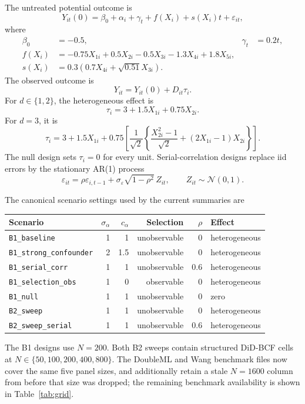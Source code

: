 \documentclass[11pt]{article}
\begin{document}
The untreated potential outcome is
\begin{equation}
 Y_{it}(0)=\beta_0+\alpha_i+\gamma_t+f(X_i)+s(X_i)t+\varepsilon_{it},
 \label{eq:untreated}
\end{equation}
where
\begin{align}
 \beta_0&=-0.5, & \gamma_t&=0.2t,\\
 f(X_i)&=-0.75X_{1i}+0.5X_{2i}-0.5X_{3i}-1.3X_{4i}+1.8X_{5i},\\
 s(X_i)&=0.3\left(0.7X_{4i}+\sqrt{0.51}X_{3i}\right).
 \label{eq:canonical-components}
\end{align}
The observed outcome is
\begin{equation}
 Y_{it}=Y_{it}(0)+D_{it}\tau_i.
 \label{eq:canonical-outcome}
\end{equation}
For $d\in\{1,2\}$, the heterogeneous effect is
\begin{equation}
 \tau_i=3+1.5X_{1i}+0.75X_{2i}.
 \label{eq:tau-linear}
\end{equation}
For $d=3$, it is
\begin{equation}
 \tau_i=3+1.5X_{1i}+0.75\left[
 \frac{1}{\sqrt{2}}\left\{
 \frac{X_{2i}^2-1}{\sqrt{2}}+(2X_{1i}-1)X_{2i}
 \right\}\right].
 \label{eq:tau-nonlinear}
\end{equation}
The null design sets $\tau_i=0$ for every unit. Serial-correlation designs
replace iid errors by the stationary AR(1) process
\begin{equation}
 \varepsilon_{it}=\rho\varepsilon_{i,t-1}
 +\sigma_\varepsilon\sqrt{1-\rho^2}\,Z_{it},
 \qquad Z_{it}\sim\mathcal{N}(0,1).
 \label{eq:ar1}
\end{equation}

The canonical scenario settings used by the current summaries are
\begin{center}
\begin{tabular}{lrrrrl}
\toprule
Scenario & $\sigma_\alpha$ & $c_\alpha$ & Selection & $\rho$ & Effect \\
\midrule
\texttt{B1\_baseline} & 1 & 1 & unobservable & 0 & heterogeneous \\
\texttt{B1\_strong\_confounder} & 2 & 1.5 & unobservable & 0 & heterogeneous \\
\texttt{B1\_serial\_corr} & 1 & 1 & unobservable & 0.6 & heterogeneous \\
\texttt{B1\_selection\_obs} & 1 & 0 & observable & 0 & heterogeneous \\
\texttt{B1\_null} & 1 & 1 & unobservable & 0 & zero \\
\texttt{B2\_sweep} & 1 & 1 & unobservable & 0 & heterogeneous \\
\texttt{B2\_sweep\_serial} & 1 & 1 & unobservable & 0.6 & heterogeneous \\
\bottomrule
\end{tabular}
\end{center}
The B1 designs use $N=200$. Both B2 sweeps contain structured DiD-BCF cells at
$N\in\{50,100,200,400,800\}$. The DoubleML and Wang benchmark files now cover
the same five panel sizes, and additionally retain a stale $N=1600$ column from
before that size was dropped; the remaining benchmark availability is shown in
Table~\ref{tab:grid}.
\end{document}
